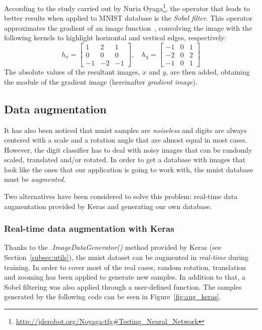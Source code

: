 According to the study carried out by Nuria Oyaga\footnote{\url{http://jderobot.org/Noyaga-tfg\#Testing\_Neural\_Network}}, the operator that leads to better results when applied to MNIST database is the \emph{Sobel filter}. This operator approximates the gradient of an image function~\cite{sonka1999image}, convolving the image with the following kernels to highlight horizontal and vertical edges, respectively:  
\begin{equation}\label{eq:sobel}
h_x = 
\begin{bmatrix}
1 & 2 & 1\\
0 & 0 & 0\\
-1 & -2 & -1
\end{bmatrix}
,\quad
h_y = 
\begin{bmatrix}
-1 & 0 & 1\\
-2 & 0 & 2\\
-1 & 0 & 1
\end{bmatrix}
\end{equation}
The absolute values of the resultant images, $x$ and $y$, are then added, obtaining the module of the gradient image (hereinafter \emph{gradient image}).

\subsection{Data augmentation}
It has also been noticed that \gls{mnist} samples are \emph{noiseless} and digits are always centered with a scale and a rotation angle that are almost equal in most cases. However, the digit classifier has to deal with noisy images that can be randomly scaled, translated and/or rotated. In order to get a database with images that look like the ones that our application is going to work with, the \gls{mnist} database must be \emph{augmented}.

Two alternatives have been considered to solve this problem: real-time data augmentation provided by Keras and generating our own database.

\subsubsection{Real-time data augmentation with Keras}
Thanks to the \textit{.ImageDataGenerator()} method provided by Keras (see Section~\ref{subsec:utils}), the \gls{mnist} dataset can be augmented in \emph{real-time} during training. In order to cover most of the real cases, random rotation, translation and zooming has been applied to generate new samples. In addition to that, a Sobel filtering was also applied through a user-defined function. The samples generated by the following code can be seen in Figure~\ref{fig:aug_keras}.

